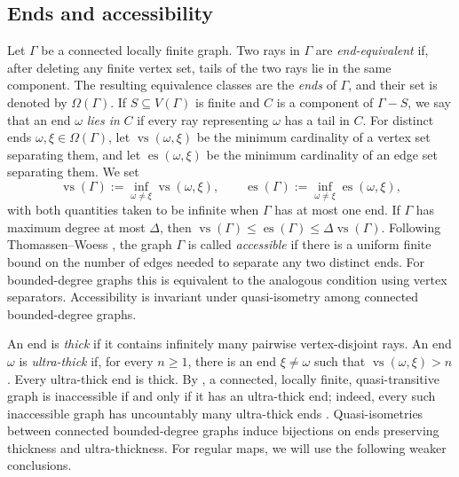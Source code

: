 \documentclass[10pt,a4paper]{amsart}
\theoremstyle{definition}
\begin{document}
\subsection{Ends and accessibility}\label{subsec:ends-accessibility}

Let $\Gamma$ be a connected locally finite graph.
Two rays in $\Gamma$ are \emph{end-equivalent} if, after deleting any finite vertex set, tails of the two rays lie in the same component.
The resulting equivalence classes are the \emph{ends} of $\Gamma$, and their set is denoted by $\Omega(\Gamma)$.
If $S\subseteq V(\Gamma)$ is finite and $C$ is a component of $\Gamma-S$, we say that an end $\omega$ \emph{lies in} $C$ if every ray representing $\omega$ has a tail in $C$.
For distinct ends $\omega,\xi\in\Omega(\Gamma)$, let $\operatorname{vs}(\omega,\xi)$ be the minimum cardinality of a vertex set separating them, and let $\operatorname{es}(\omega,\xi)$ be the minimum cardinality of an edge set separating them.
We set
\begin{equation}\label{eq:end-separation-infima}
\operatorname{vs}(\Gamma):=\inf_{\omega\neq\xi}\operatorname{vs}(\omega,\xi),
\qquad
\operatorname{es}(\Gamma):=\inf_{\omega\neq\xi}\operatorname{es}(\omega,\xi),
\end{equation}
with both quantities taken to be infinite when $\Gamma$ has at most one end.
If $\Gamma$ has maximum degree at most $\Delta$, then $\operatorname{vs}(\Gamma)\leq\operatorname{es}(\Gamma)\leq\Delta\operatorname{vs}(\Gamma)$.
Following Thomassen--Woess \cite{thomassen1993vertex}, the graph $\Gamma$ is called \emph{accessible} if there is a uniform finite bound on the number of edges needed to separate any two distinct ends.
For bounded-degree graphs this is equivalent to the analogous condition using vertex separators. Accessibility is invariant under quasi-isometry among connected bounded-degree graphs.

An end is \emph{thick} if it contains infinitely many pairwise vertex-disjoint rays.
An end $\omega$ is \emph{ultra-thick} if, for every $n\geq1$, there is an end $\xi\neq\omega$ such that $\operatorname{vs}(\omega,\xi)>n$.
Every ultra-thick end is thick.
By \cite[Thm.~5.4]{thomassen1993vertex}, a connected, locally finite, quasi-transitive graph is inaccessible if and only if it has an ultra-thick end; indeed, every such inaccessible graph has uncountably many ultra-thick ends \cite[Thm.~1]{moller1996accessibility}.
Quasi-isometries between connected bounded-degree graphs induce bijections on ends preserving thickness and ultra-thickness.
For regular maps, we will use the following weaker conclusions.
\end{document}

